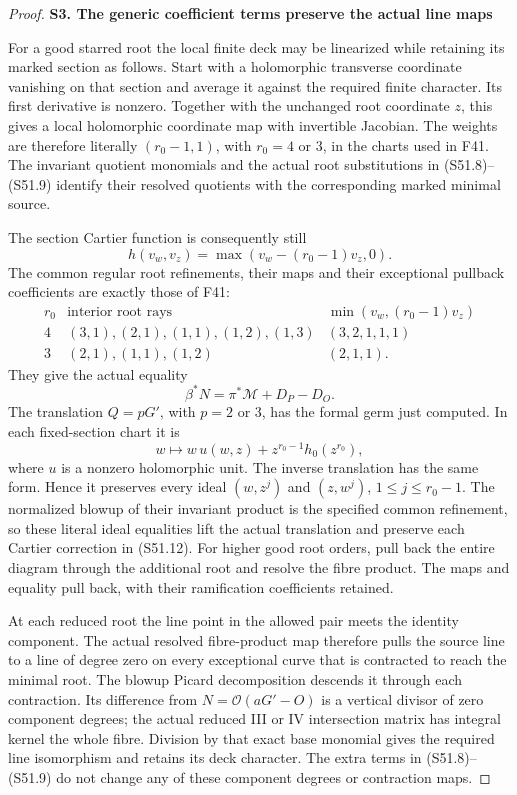 \begin{proof}
\par

\medskip\noindent\textbf{S3. The generic coefficient terms preserve the actual line maps}

\par\nobreak

For a good starred root the local finite deck may be
linearized while retaining its marked section as follows.
Start with a holomorphic transverse coordinate vanishing
on that section and average it against the required finite
character. Its first derivative is nonzero. Together with
the unchanged root coordinate \(z\), this gives a local
holomorphic coordinate map with invertible Jacobian.
The weights are therefore literally \((r_0-1,1)\), with
\(r_0=4\) or \(3\), in the charts used in F41.
The invariant quotient monomials and the actual root
substitutions in (S51.8)--(S51.9) identify their resolved
quotients with the corresponding marked minimal source.

The section Cartier function is consequently still
\[
             h(v_w,v_z)=\max(v_w-(r_0-1)v_z,0).
\]
The common regular root refinements, their maps and their
exceptional pullback coefficients are exactly those of F41:
\[
 \begin{array}{c|c|c}
 r_0&\text{interior root rays}&
       \min(v_w,(r_0-1)v_z)\\ \hline
 4&(3,1),(2,1),(1,1),(1,2),(1,3)&(3,2,1,1,1)\\
 3&(2,1),(1,1),(1,2)&(2,1,1).
 \end{array}
\]
They give the actual equality
\[
                 \beta^*N=\pi^*\mathcal M+D_P-D_O.
 \tag{S51.12}
\]
The translation \(Q=pG'\), with \(p=2\) or \(3\), has
the formal germ just computed. In each fixed-section chart
it is
\[
          w\longmapsto w\,u(w,z)+z^{r_0-1}h_0(z^{r_0}),
 \tag{S51.13}
\]
where \(u\) is a nonzero holomorphic unit. The inverse
translation has the same form. Hence it preserves every
ideal \((w,z^j)\) and \((z,w^j)\), \(1\le j\le r_0-1\).
The normalized blowup of their invariant product is the
specified common refinement, so these literal ideal
equalities lift the actual translation and preserve each
Cartier correction in (S51.12).
For higher good root orders, pull back the entire diagram
through the additional root and resolve the fibre product.
The maps and equality pull back, with their ramification
coefficients retained.

At each reduced root the line point in the allowed pair
meets the identity component. The actual resolved
fibre-product map therefore pulls the source line to a
line of degree zero on every exceptional curve that is
contracted to reach the minimal root. The blowup Picard
decomposition descends it through each contraction.
Its difference from \(N=\mathcal O(aG'-O)\) is a vertical
divisor of zero component degrees; the actual reduced
III or IV intersection matrix has integral kernel the
whole fibre. Division by that exact base monomial gives
the required line isomorphism and retains its deck
character. The extra terms in (S51.8)--(S51.9) do not change
any of these component degrees or contraction maps.


\end{proof}
